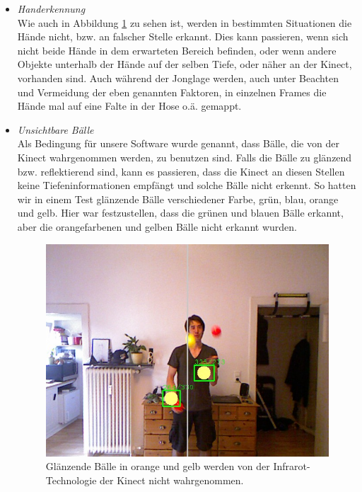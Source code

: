 \documentclass[12pt,a4paper,ngerman]{scrartcl}
\begin{document}
\begin{itemize}
\begin{figure}[H]
    \label{twohands}
\end{figure}
\item {\em Handerkennung}\\
Wie auch in Abbildung \ref{twohands} zu sehen ist, werden in bestimmten Situationen die Hände nicht, bzw. an falscher Stelle erkannt. Dies kann passieren, wenn sich nicht beide Hände in dem erwarteten Bereich befinden, oder wenn andere Objekte unterhalb der Hände auf der selben Tiefe, oder näher an der Kinect, vorhanden sind. Auch während der Jonglage werden, auch unter Beachten und Vermeidung der eben genannten Faktoren, in einzelnen Frames die Hände mal auf eine Falte in der Hose o.ä. gemappt.
\item {\em Unsichtbare Bälle}\\
Als Bedingung für unsere Software wurde genannt, dass Bälle, die von der Kinect wahrgenommen werden, zu benutzen sind. Falls die Bälle zu glänzend bzw. reflektierend sind, kann es passieren, dass die Kinect an diesen Stellen keine Tiefeninformationen empfängt und solche Bälle nicht erkennt. So hatten wir in einem Test glänzende Bälle verschiedener Farbe, grün, blau, orange und gelb. Hier war festzustellen, dass die grünen und blauen Bälle erkannt, aber die orangefarbenen und gelben Bälle nicht erkannt wurden.
\begin{figure}[H]
    \centering
    \includegraphics[scale=0.5]{img/bewertung_unsichtbar.jpg}
    \caption{Glänzende Bälle in orange und gelb werden von der Infrarot-Technologie der Kinect nicht wahrgenommen.}
\end{figure}
\end{itemize}
\end{document}
